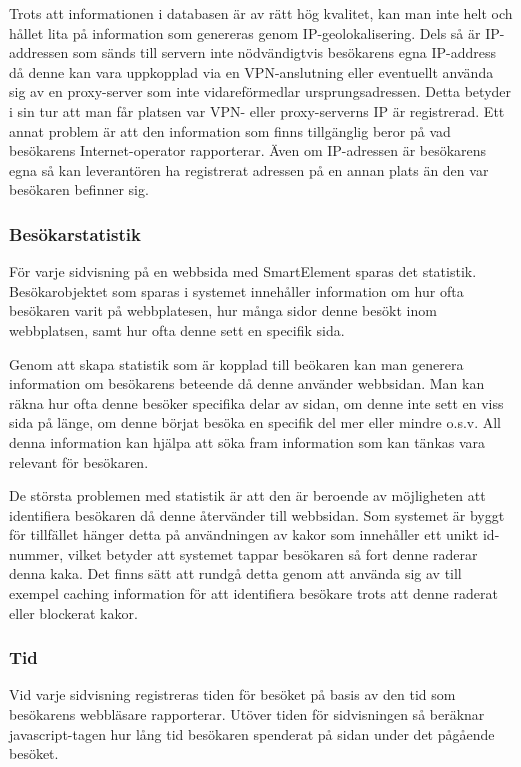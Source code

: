 Trots att informationen i databasen är av rätt hög kvalitet, kan man inte helt och hållet lita på information som genereras genom IP-geolokalisering. Dels så är IP-addressen som sänds till servern inte nödvändigtvis besökarens egna IP-address då denne kan vara uppkopplad via en VPN-anslutning eller eventuellt använda sig av en proxy-server som inte vidareförmedlar ursprungsadressen. Detta betyder i sin tur att man får platsen var VPN- eller proxy-serverns IP är registrerad. Ett annat problem är att den information som finns tillgänglig beror på vad besökarens Internet-operator rapporterar. Även om IP-adressen är besökarens egna så kan leverantören ha registrerat adressen på en annan plats än den var besökaren befinner sig. 

\subsubsection{Besökarstatistik}

För varje sidvisning på en webbsida med SmartElement sparas det statistik. Besökarobjektet som sparas i systemet innehåller information om hur ofta besökaren varit på webbplatesen, hur många sidor denne besökt inom webbplatsen, samt hur ofta denne sett en specifik sida.

Genom att skapa statistik som är kopplad till beökaren kan man generera information om besökarens beteende då denne använder webbsidan. Man kan räkna hur ofta denne besöker specifika delar av sidan, om denne inte sett en viss sida på länge, om denne börjat besöka en specifik del mer eller mindre o.s.v. All denna information kan hjälpa att söka fram information som kan tänkas vara relevant för besökaren.

De största problemen med statistik är att den är beroende av möjligheten att identifiera besökaren då denne återvänder till webbsidan. Som systemet är byggt för tillfället hänger detta på användningen av kakor som innehåller ett unikt id-nummer, vilket betyder att systemet tappar besökaren så fort denne raderar denna kaka. Det finns sätt att rundgå detta genom att använda sig av till exempel caching information för att identifiera besökare trots att denne raderat eller blockerat kakor. \citep{ashkanblog}



\subsubsection{Tid}

Vid varje sidvisning registreras tiden för besöket på basis av den tid som besökarens webbläsare rapporterar. Utöver tiden för sidvisningen så beräknar javascript-tagen hur lång tid besökaren spenderat på sidan under det pågående besöket.

